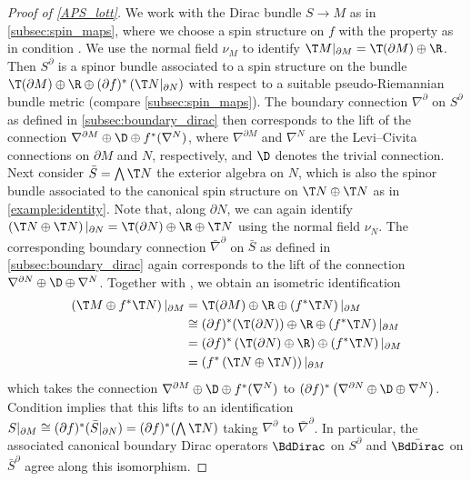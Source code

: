 \documentclass[a4paper,11pt]{amsart}
\numberwithin{equation}{section}
\begin{document}
\begin{proof}[Proof of \cref{APS_lott}]
    We work with the Dirac bundle \(S \to M\) as in \cref{subsec:spin_maps}, where we choose a spin structure on \(f\) with the property as in condition .
    We use the normal field \(\nu_M\) to identify \(\T M|_{\partial M} = \T(\partial M) \oplus \R\).
    Then \(S^\partial\) is a spinor bundle associated to a spin structure on the bundle \(\T (\partial M) \oplus \R \oplus (\partial f)^\ast \left( \T N|_{\partial N}\right)\) with respect to a suitable pseudo-Riemannian bundle metric (compare \cref{subsec:spin_maps}).
    The boundary connection \(\nabla^\partial\) on \(S^\partial\) as defined in \cref{subsec:boundary_dirac} then corresponds to the lift of the connection \(\nabla^{\partial M} \oplus \D \oplus f^\ast(\nabla^N)\), where \(\nabla^{\partial M}\) and \(\nabla^N\) are the Levi--Civita connections on \(\partial M\) and \(N\), respectively, and \(\D\) denotes the trivial connection.
    Next consider \(\bar{S} = \bigwedge \T N\) the exterior algebra on \(N\), which is also the spinor bundle associated to the canonical spin structure on \(\T N \oplus \T N\) as in \cref{example:identity}.
    Note that, along \(\partial N\), we can again identify \(\left(\T N \oplus \T N \right)|_{\partial N} = \T (\partial N) \oplus \R \oplus \T N\) using the normal field \(\nu_N\).
    The corresponding boundary connection \(\bar{\nabla}^\partial\) on \(\bar{S}\) as defined in \cref{subsec:boundary_dirac} again corresponds to the lift of the connection \(\nabla^{\partial N} \oplus \D \oplus \nabla^N\).
    Together with , we obtain an isometric identification
    \begin{align*}
        \left( \T M \oplus f^\ast \T N \right)|_{\partial M} &=  \T(\partial M) \oplus \R \oplus \left( f^\ast \T N \right)|_{\partial M} \\
        &\cong (\partial f)^\ast (\T (\partial N)) \oplus \R \oplus \left( f^\ast \T N \right)|_{\partial M} \\
        &= (\partial f)^\ast \left( \T (\partial N) \oplus \R \right) \oplus \left( f^\ast \T N \right)|_{\partial M} \\
        &= \left( f^\ast \left(  \T N \oplus \T N \right)\right)|_{\partial M}
    \end{align*}
    which takes the connection \(\nabla^{\partial M} \oplus \D \oplus f^\ast(\nabla^N)\) to \((\partial f)^\ast \left( \nabla^{\partial N} \oplus \D \oplus \nabla^N \right)\).
    Condition  implies that this lifts to an identification \(S|_{\partial M} \cong (\partial f)^\ast (\bar{S}|_{\partial N}) = (\partial f)^\ast(\bigwedge \T N)\) taking \(\nabla^\partial\) to \(\bar{\nabla}^\partial\).
    In particular, the associated canonical boundary Dirac operators \(\BdDirac\) on \(S^\partial\) and \(\bar{\BdDirac}\) on \(\bar{S}^\partial\) agree along this isomorphism.
    

\end{proof}
\end{document}
